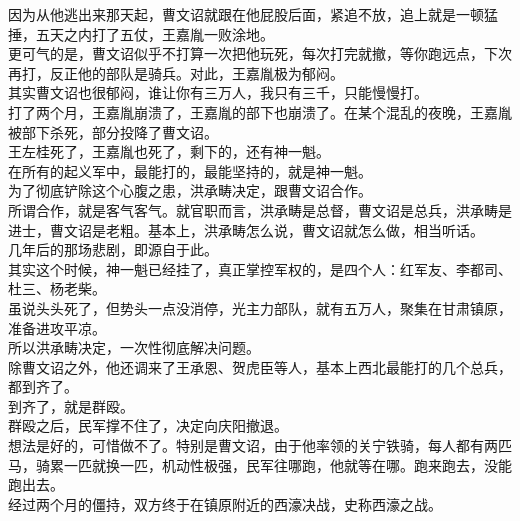 \begin{multicols}{\theparacolNo}
因为从他逃出来那天起，曹文诏就跟在他屁股后面，紧追不放，追上就是一顿猛捶，五天之内打了五仗，王嘉胤一败涂地。\\

更可气的是，曹文诏似乎不打算一次把他玩死，每次打完就撤，等你跑远点，下次再打，反正他的部队是骑兵。对此，王嘉胤极为郁闷。\\

其实曹文诏也很郁闷，谁让你有三万人，我只有三千，只能慢慢打。\\

打了两个月，王嘉胤崩溃了，王嘉胤的部下也崩溃了。在某个混乱的夜晚，王嘉胤被部下杀死，部分投降了曹文诏。\\

王左桂死了，王嘉胤也死了，剩下的，还有神一魁。\\

在所有的起义军中，最能打的，最能坚持的，就是神一魁。\\

为了彻底铲除这个心腹之患，洪承畴决定，跟曹文诏合作。\\

所谓合作，就是客气客气。就官职而言，洪承畴是总督，曹文诏是总兵，洪承畴是进士，曹文诏是老粗。基本上，洪承畴怎么说，曹文诏就怎么做，相当听话。\\

几年后的那场悲剧，即源自于此。\\

其实这个时候，神一魁已经挂了，真正掌控军权的，是四个人：红军友、李都司、杜三、杨老柴。\\

虽说头头死了，但势头一点没消停，光主力部队，就有五万人，聚集在甘肃镇原，准备进攻平凉。\\

所以洪承畴决定，一次性彻底解决问题。\\

除曹文诏之外，他还调来了王承恩、贺虎臣等人，基本上西北最能打的几个总兵，都到齐了。\\

到齐了，就是群殴。\\

群殴之后，民军撑不住了，决定向庆阳撤退。\\

想法是好的，可惜做不了。特别是曹文诏，由于他率领的关宁铁骑，每人都有两匹马，骑累一匹就换一匹，机动性极强，民军往哪跑，他就等在哪。跑来跑去，没能跑出去。\\

经过两个月的僵持，双方终于在镇原附近的西濠决战，史称西濠之战。\\


\end{multicols}
